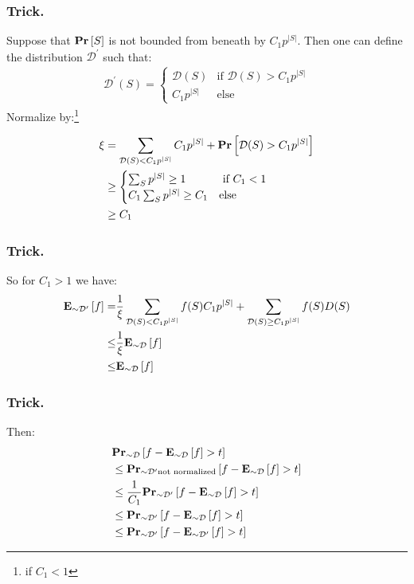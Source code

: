 \documentclass{beamer}
\begin{document}
\begin{frame}
  \frametitle{Trick.}
Suppose that $\prb{S}$ is not bounded from beneath by $C_{1}p^{|S|}$. Then one can define the distribution $\mathcal{D}^{\prime}$ such that:
  \begin{align*}
    \mathcal{D}^{\prime}(S) = \begin{cases}
      \mathcal{D}(S) & \text{if }\mathcal{D}(S) > C_{1}p^{|S|} \\
      C_{1}p^{|S|} & \text{else} 
    \end{cases}
  \end{align*}
  Normalize by:\footnote{ if $C_{1} < 1$ } 

  \begin{align*}
    \xi & =  \sum_{ \mathcal{D}(S) < C_{1}p^{|S|}} C_{1}p^{|S|} + \prb{\mathcal{D}(S) > C_{1}p^{|S|}} \\
    & \ge \begin{cases}
      \sum_{S} p^{|S|} \ge 1  & \text{ if } C_{1} < 1 \\
      C_{1} \sum_{S} p^{|S|} \ge C_{1} & \text{else} 
        \end{cases}  \\ 
        & \ge C_{1}
  \end{align*}
\end{frame}

\begin{frame}
  \frametitle{Trick.}
  So for $C_{1} > 1$ we have: 
  \begin{align*}
    \exppm{ f }{\sim \mathcal{D}^{\prime} }  = & \frac{1}{\xi} \sum_{ \mathcal{D}(S) < C_{1}p^{|S|}} f(S)C_{1}p^{|S|} + \sum_{ \mathcal{D}(S) \ge C_{1}p^{|S|}}f(S)D(S) \\
    \le & \frac{1}{\xi}\exppm{ f }{\sim \mathcal{D} } \\
    \le & \exppm{ f }{\sim \mathcal{D} }
  \end{align*}

\end{frame}
\begin{frame}

  \frametitle{Trick.}
 Then: 
\begin{align*}
  & \prbm{f - \exppm{f}{ \sim\mathcal{D} } > t }{\sim\mathcal{D}} \\
  &\le  \prbm{f - \exppm{f}{ \sim\mathcal{D} } > t }{\sim\mathcal{D}^{\prime} \text{not normalized} } \\ 
  &\le  \frac{1}{C_{1}}\prbm{f - \exppm{f}{ \sim\mathcal{D} } > t }{\sim\mathcal{D}^{\prime} } \\ 
  &\le  \prbm{f - \exppm{f}{ \sim\mathcal{D} } > t }{\sim\mathcal{D}^{\prime} } \\
  &\le  \prbm{f - \exppm{f}{ \sim\mathcal{D}^{\prime} } > t }{\sim\mathcal{D}^{\prime} } 
\end{align*}

 
\end{frame}
\end{document}
